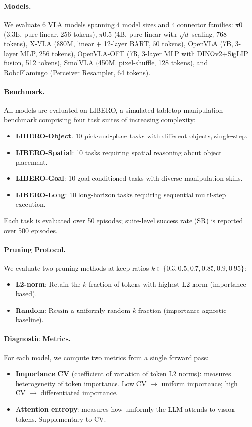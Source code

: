 \documentclass[10pt,letterpaper]{article}
\begin{document}
\paragraph{Models.} We evaluate 6 VLA models spanning 4 model sizes and 4 connector families: $\pi$0 (3.3B, pure linear, 256 tokens), $\pi$0.5 (4B, pure linear with $\sqrt{d}$ scaling, 768 tokens), X-VLA (880M, linear + 12-layer BART, 50 tokens), OpenVLA (7B, 3-layer MLP, 256 tokens), OpenVLA-OFT (7B, 3-layer MLP with DINOv2+SigLIP fusion, 512 tokens), SmolVLA (450M, pixel-shuffle, 128 tokens), and RoboFlamingo (Perceiver Resampler, 64 tokens).

\paragraph{Benchmark.} All models are evaluated on LIBERO, a simulated tabletop manipulation benchmark comprising four task suites of increasing complexity:
\begin{itemize}
\item \textbf{LIBERO-Object}: 10 pick-and-place tasks with different objects, single-step.
\item \textbf{LIBERO-Spatial}: 10 tasks requiring spatial reasoning about object placement.
\item \textbf{LIBERO-Goal}: 10 goal-conditioned tasks with diverse manipulation skills.
\item \textbf{LIBERO-Long}: 10 long-horizon tasks requiring sequential multi-step execution.
\end{itemize}
Each task is evaluated over 50 episodes; suite-level success rate (SR) is reported over 500 episodes.

\paragraph{Pruning Protocol.} We evaluate two pruning methods at keep ratios $k \in \{0.3, 0.5, 0.7, 0.85, 0.9, 0.95\}$:
\begin{itemize}
\item \textbf{L2-norm}: Retain the $k$-fraction of tokens with highest L2 norm (importance-based).
\item \textbf{Random}: Retain a uniformly random $k$-fraction (importance-agnostic baseline).
\end{itemize}

\paragraph{Diagnostic Metrics.} For each model, we compute two metrics from a single forward pass:
\begin{itemize}
\item \textbf{Importance CV} (coefficient of variation of token L2 norms): measures heterogeneity of token importance. Low CV $\to$ uniform importance; high CV $\to$ differentiated importance.
\item \textbf{Attention entropy}: measures how uniformly the LLM attends to vision tokens. Supplementary to CV.
\end{itemize}
\end{document}
